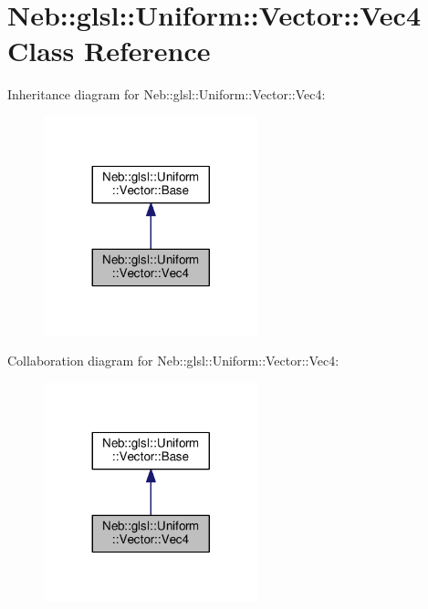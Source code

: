 \hypertarget{classNeb_1_1glsl_1_1Uniform_1_1Vector_1_1Vec4}{\section{Neb\-:\-:glsl\-:\-:Uniform\-:\-:Vector\-:\-:Vec4 Class Reference}
\label{classNeb_1_1glsl_1_1Uniform_1_1Vector_1_1Vec4}
}


Inheritance diagram for Neb\-:\-:glsl\-:\-:Uniform\-:\-:Vector\-:\-:Vec4\-:
\nopagebreak
\begin{figure}[H]
\begin{center}
\leavevmode
\includegraphics[width=176pt]{classNeb_1_1glsl_1_1Uniform_1_1Vector_1_1Vec4__inherit__graph}
\end{center}
\end{figure}


Collaboration diagram for Neb\-:\-:glsl\-:\-:Uniform\-:\-:Vector\-:\-:Vec4\-:
\nopagebreak
\begin{figure}[H]
\begin{center}
\leavevmode
\includegraphics[width=176pt]{classNeb_1_1glsl_1_1Uniform_1_1Vector_1_1Vec4__coll__graph}
\end{center}
\end{figure}
